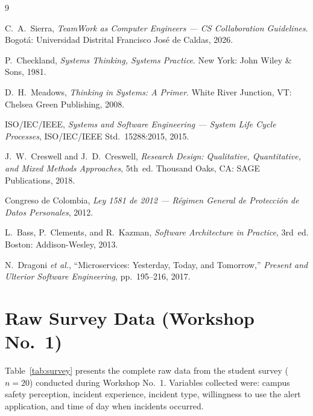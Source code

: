 \documentclass[12pt, oneside]{article}
\begin{document}
\newpage
\begin{thebibliography}{9}

C.~A.~Sierra,
\textit{TeamWork as Computer Engineers --- CS Collaboration Guidelines}.
Bogot\'a: Universidad Distrital Francisco Jos\'e de Caldas, 2026.

P.~Checkland,
\textit{Systems Thinking, Systems Practice}.
New York: John Wiley \& Sons, 1981.

D.~H.~Meadows,
\textit{Thinking in Systems: A Primer}.
White River Junction, VT: Chelsea Green Publishing, 2008.

ISO/IEC/IEEE,
\textit{Systems and Software Engineering --- System Life Cycle Processes},
ISO/IEC/IEEE Std.~15288:2015, 2015.

J.~W.~Creswell and J.~D.~Creswell,
\textit{Research Design: Qualitative, Quantitative, and Mixed Methods Approaches},
5th~ed. Thousand Oaks, CA: SAGE Publications, 2018.

Congreso de Colombia,
\textit{Ley 1581 de 2012 --- R\'egimen General de Protecci\'on de Datos Personales},
2012.

L.~Bass, P.~Clements, and R.~Kazman,
\textit{Software Architecture in Practice}, 3rd~ed.
Boston: Addison-Wesley, 2013.

N.~Dragoni \textit{et al.},
``Microservices: Yesterday, Today, and Tomorrow,''
\textit{Present and Ulterior Software Engineering},
pp.~195--216, 2017.

\end{thebibliography}

\newpage
\appendix

\section{Raw Survey Data (Workshop No.~1)}
\label{app:survey}

Table~\ref{tab:survey} presents the complete raw data from the student survey ($n = 20$)
conducted during Workshop No.~1. Variables collected were: campus safety perception,
incident experience, incident type, willingness to use the alert application, and time of
day when incidents occurred.
\end{document}
